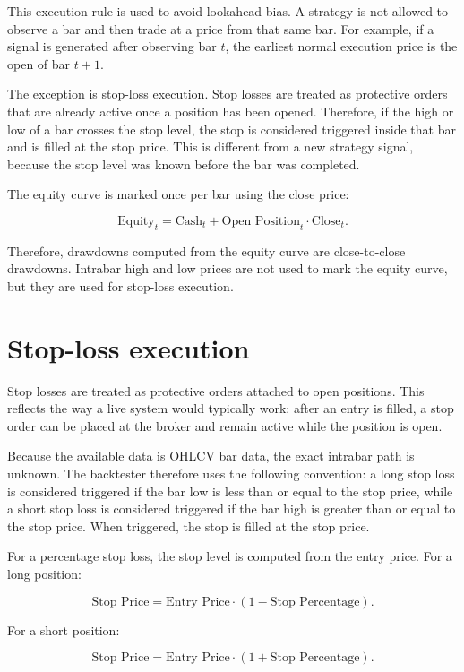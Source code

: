 This execution rule is used to avoid lookahead bias. A strategy is not allowed to observe a bar and
then trade at a price from that same bar. For example, if a signal is generated after observing bar
\(t\), the earliest normal execution price is the open of bar \(t+1\).

The exception is stop-loss execution. Stop losses are treated as protective orders that are already
active once a position has been opened. Therefore, if the high or low of a bar crosses the stop
level, the stop is considered triggered inside that bar and is filled at the stop price. This is
different from a new strategy signal, because the stop level was known before the bar was completed.

The equity curve is marked once per bar using the close price:

\[
\text{Equity}_t = \text{Cash}_t + \text{Open Position}_t \cdot \text{Close}_t.
\]

Therefore, drawdowns computed from the equity curve are close-to-close drawdowns. Intrabar high and
low prices are not used to mark the equity curve, but they are used for stop-loss execution.

\section{Stop-loss execution}

Stop losses are treated as protective orders attached to open positions. This reflects the way a
live system would typically work: after an entry is filled, a stop order can be placed at the broker
and remain active while the position is open.

Because the available data is OHLCV bar data, the exact intrabar path is unknown. The backtester
therefore uses the following convention: a long stop loss is considered triggered if the bar low is
less than or equal to the stop price, while a short stop loss is considered triggered if the bar
high is greater than or equal to the stop price. When triggered, the stop is filled at the stop
price.

For a percentage stop loss, the stop level is computed from the entry price. For a long position:

\[
\text{Stop Price} = \text{Entry Price} \cdot (1 - \text{Stop Percentage}).
\]

For a short position:

\[
\text{Stop Price} = \text{Entry Price} \cdot (1 + \text{Stop Percentage}).
\]

